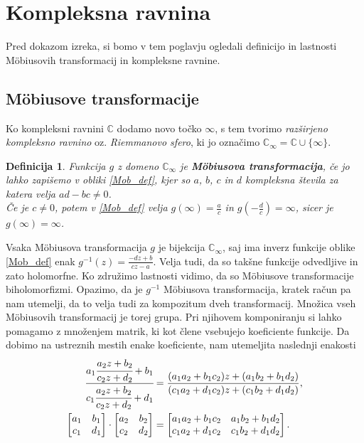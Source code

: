 \documentclass[a4paper,12pt]{article}
\def\C{\mathbb{C}} %
\def\Ci{\mathbb{C}_{\infty}} %
\newtheorem{definicija}{Definicija}
\begin{document}

\section{Kompleksna ravnina}
\label{Pogled_pogl}

Pred dokazom izreka, si bomo v tem poglavju ogledali definicijo in lastnosti M\"obiusovih transformacij in kompleksne ravnine.


\subsection{M\"obiusove transformacije}
Ko kompleksni ravnini $\C$ dodamo novo točko $\infty$, s tem tvorimo \emph{razširjeno kompleksno ravnino} oz. \emph{Riemmanovo sfero}, ki jo označimo $\Ci = \C \cup \{\infty\}$.
\begin{definicija}
Funkcija $g$ z domeno $\Ci$ je \textbf{M\"obiusova transformacija}, če jo lahko zapišemo v obliki \eqref{Mob_def}, kjer so $a$, $b$, $c$ in $d$ kompleksna števila za katera velja $ad - bc \neq 0$. \\
Če je $c \neq 0$, potem v \eqref{Mob_def} velja $g(\infty) = \frac{a}{c}$ in $g(-\frac{d}{c}) = \infty$, sicer je $g(\infty) = \infty$.
\end{definicija}

Vsaka M\"obiusova transformacija $g$ je bijekcija $\Ci$, saj ima inverz funkcije oblike \eqref{Mob_def} enak $g^{-1}(z) = \frac{-dz + b}{cz - a}$. Velja tudi, da so takšne funkcije odvedljive in zato holomorfne. Ko združimo lastnosti vidimo, da so M\"obiusove transformacije biholomorfizmi. Opazimo, da je $g^{-1}$ M\"obiusova transformacija, kratek račun pa nam utemelji, da to velja tudi za kompozitum dveh transformacij. Množica vseh M\"obiusovih transformacij je torej grupa. Pri njihovem komponiranju si lahko pomagamo z množenjem matrik, ki kot člene vsebujejo koeficiente funkcije. Da dobimo na ustreznih mestih enake koeficiente, nam utemeljita naslednji enakosti
\begin{align*}
    \cfrac{a_1\cfrac{a_2z + b_2}{c_2z + d_2} + b_1}{c_1\cfrac{a_2z + b_2}{c_2z + d_2} + d_1} &= \frac{(a_1a_2 + b_1c_2)z + (a_1b_2 + b_1d_2)}{(c_1a_2 + d_1c_2)z + (c_1b_2+d_1d_2)},
    \\
    \begin{bmatrix}
        a_1 & b_1\\
        c_1 & d_1
    \end{bmatrix}
    \cdot
    \begin{bmatrix}
        a_2 & b_2\\
        c_2 & d_2
    \end{bmatrix}
    &=
    \begin{bmatrix}
        a_1a_2 + b_1c_2 & a_1b_2 + b_1d_2\\
        c_1a_2 + d_1c_2 & c_1b_2+d_1d_2
    \end{bmatrix}.
\end{align*}
\end{document}
